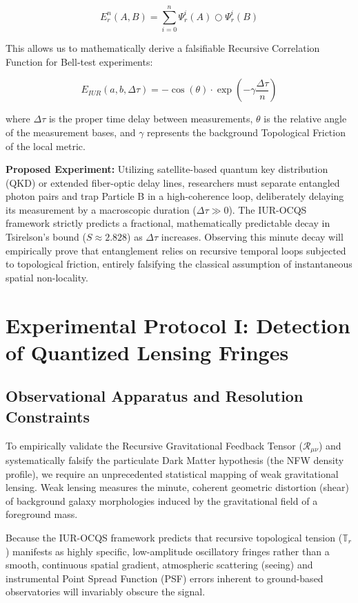 \documentclass[12pt,openany]{book}
\begin{document}
\begin{equation}
E_r^n(A,B) = \sum_{i=0}^n \Psi_r^i(A) \bigcirc \Psi_r^i(B)
\end{equation}

This allows us to mathematically derive a falsifiable Recursive Correlation Function for Bell-test experiments:

\begin{equation}
E_{IUR}(a,b,\Delta\tau) = -\cos(\theta) \cdot \exp\left(-\gamma \frac{\Delta\tau}{n}\right)
\end{equation}

where $\Delta\tau$ is the proper time delay between measurements, $\theta$ is the relative angle of the measurement bases, and $\gamma$ represents the background Topological Friction of the local metric.

\textbf{Proposed Experiment:} Utilizing satellite-based quantum key distribution (QKD) or extended fiber-optic delay lines, researchers must separate entangled photon pairs and trap Particle B in a high-coherence loop, deliberately delaying its measurement by a macroscopic duration ($\Delta\tau \gg 0$). The IUR-OCQS framework strictly predicts a fractional, mathematically predictable decay in Tsirelson's bound ($S \approx 2.828$) as $\Delta\tau$ increases. Observing this minute decay will empirically prove that entanglement relies on recursive temporal loops subjected to topological friction, entirely falsifying the classical assumption of instantaneous spatial non-locality.

\chapter{Experimental Protocol I: Detection of Quantized Lensing Fringes}

\section{Observational Apparatus and Resolution Constraints}
To empirically validate the Recursive Gravitational Feedback Tensor ($\mathcal{R}_{\mu\nu}$) and systematically falsify the particulate Dark Matter hypothesis (the NFW density profile), we require an unprecedented statistical mapping of weak gravitational lensing. Weak lensing measures the minute, coherent geometric distortion (shear) of background galaxy morphologies induced by the gravitational field of a foreground mass.

Because the IUR-OCQS framework predicts that recursive topological tension ($\mathbb{T}_r$) manifests as highly specific, low-amplitude oscillatory fringes rather than a smooth, continuous spatial gradient, atmospheric scattering (seeing) and instrumental Point Spread Function (PSF) errors inherent to ground-based observatories will invariably obscure the signal. 
\end{document}
